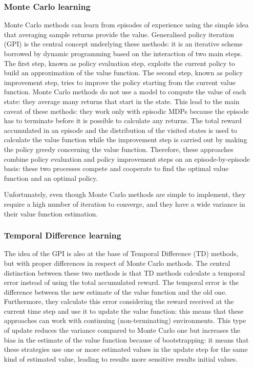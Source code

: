 \subsubsection{Monte Carlo learning}

Monte Carlo methods \cite[Chapter 5]{sutton2018reinforcement} can learn from episodes of experience using the simple idea that averaging sample returns provide the value. Generalised policy iteration (GPI) is the central concept underlying these methods: it is an iterative scheme borrowed by dynamic programming based on the interaction of two main steps. The first step, known as policy evaluation step, exploits the current policy to build an approximation of the value function. The second step, known as policy improvement step, tries to improve the policy starting from the current value function.
Monte Carlo methods do not use a model to compute the value of each state: they average many returns that start in the state. This lead to the main caveat of these methods: they work only with episodic MDPs because the episode has to terminate before it is possible to calculate any returns.
The total reward accumulated in an episode and the distribution of the visited states is used to calculate the value function while the improvement step is carried out by making the policy greedy concerning the value function.
Therefore, these approaches combine policy evaluation and policy improvement steps on an episode-by-episode basis: these two processes compete and cooperate to find the optimal value function and an optimal policy.

Unfortunately, even though Monte Carlo methods are simple to implement, they require a high number of iteration to converge, and they have a wide variance in their value function estimation.

\subsubsection{Temporal Difference learning}

The idea of the GPI is also at the base of Temporal Difference (TD) \cite[Chapter 6]{sutton2018reinforcement} methods, but with proper differences in respect of Monte Carlo methods. The central distinction between these two methods is that TD methods calculate a temporal error instead of using the total accumulated reward. The temporal error is the difference between the new estimate of the value function and the old one. Furthermore, they calculate this error considering the reward received at the current time step and use it to update the value function: this means that these approaches can work with continuing (non-terminating) environments.
This type of update reduces the variance compared to Monte Carlo one but increases the bias in the estimate of the value function because of bootstrapping: it means that these strategies use one or more estimated values in the update step for the same kind of estimated value, leading to results more sensitive results initial values.

